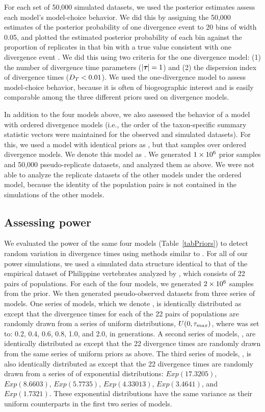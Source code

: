 \documentclass[letterpaper,12pt]{article}
\begin{document}
\begin{linenumbers}
For each set of 50,000 simulated datasets, we used the posterior estimates
assess each model's model-choice behavior.
We did this by assigning the 50,000 estimates of the posterior probability
of one divergence event to 20 bins of width 0.05, and plotted
the estimated posterior probability of each bin against the proportion of
replicates in that bin with a true value consistent with one divergence
event \cite{Huelsenbeck2004,Oaks2012}.
We did this using two criteria for the one divergence model:
(1) the number of divergence time parameters ($\lvert \boldsymbol{\tau_{}} \rvert = 1$) and
(2) the dispersion index of divergence times ($D_{T_{}} < 0.01$).
We used the one-divergence model to assess model-choice behavior, because
it is often of biogeographic interest and is easily comparable among
the three different priors used on divergence models.

In addition to the four models above, we also assessed the behavior of a model
with ordered divergence models (i.e., the order of the taxon-specific summary
statistic vectors were maintained for the observed and simulated datasets).
For this, we used a model with identical priors as \modelDPP, but that samples
over ordered divergence models.
We denote this model as \modelDPPOrdered.
We generated $1\times 10^{6}$ prior samples and 50,000 pseudo-replicate datasets, and
analyzed them as above.
We were not able to analyze the replicate datasets of the other models under
the ordered model, because the identity of the population pairs is not
contained in the simulations of the other models.

\subsection*{Assessing power}
We evaluated the power of the same four models (Table~\ref{tabPriors}) to
detect random variation in divergence times using methods similar to
\citet{Oaks2012}.
For all of our power simulations, we used a simulated data structure identical
to that of the empirical dataset of Philippine vertebrates analyzed by
\citet{Oaks2012}, which consists of 22 pairs of populations.
For each of the four models, we generated $2\times 10^{6}$ samples from the prior.
We then generated pseudo-observed datasets from three series of models.
One series of models, which we denote \powerSeriesOld, is identically
distributed as \modelOld except that the divergence times for each of the 22
pairs of populations are randomly drawn from a series of uniform distributions,
$U(0, \tau_{max})$, where  was set to: 0.2, 0.4, 0.6, 0.8, 1.0, and
2.0, in \globalcoalunit generations.
A second series of models, \powerSeriesUniform, are identically distributed as
\modelUniform except that the 22 divergence times are randomly drawn from the
same series of uniform priors as above.
The third series of models, \powerSeriesExp, is also identically
distributed as \modelUniform except that the 22 divergence times are randomly
drawn from a series of of exponential distributions: $Exp(17.3205)$,
$Exp(8.6603)$, $Exp(5.7735)$, $Exp(4.33013)$, $Exp(3.4641)$, and $Exp(1.7321)$.
These exponential distributions have the same variance as their uniform
counterparts in the first two series of models.


\end{linenumbers}
\end{document}
